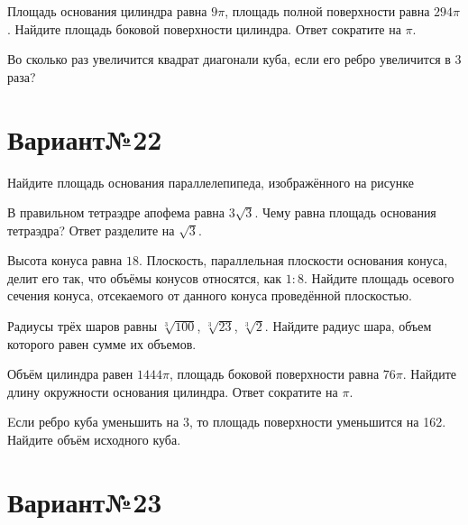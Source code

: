 \documentclass[4apaper]{article}
\begin{document}
\begin{taskBN}{5}
Площадь основания цилиндра равна $9\pi$, площадь полной поверхности равна $294\pi$. Найдите площадь боковой поверхности цилиндра. Ответ сократите на $\pi$.
\end{taskBN}

\begin{taskBN}{6}
Во сколько раз увеличится квадрат диагонали куба, если его ребро увеличится в 3 раза?
\end{taskBN}
\newpage\section*{Вариант№22}

\begin{taskBN}{1}
Найдите площадь основания параллелепипеда, изображённого на рисунке
\end{taskBN}

\begin{taskBN}{2}
В правильном тетраэдре апофема равна $3\sqrt{3}$. Чему равна площадь основания тетраэдра? Ответ разделите на $\sqrt{3}$.
\end{taskBN}

\begin{taskBN}{3}
Высота конуса равна $18$. Плоскость, параллельная плоскости основания конуса,  делит его так, что объёмы конусов относятся, как $1:8$. Найдите площадь осевого сечения конуса, отсекаемого от данного конуса проведённой плоскостью. 
\end{taskBN}

\begin{taskBN}{4}
Радиусы трёх шаров равны $\sqrt[3]{100}$, $\sqrt[3]{23}$, $\sqrt[3]{2}$. Найдите радиус шара, объем которого равен сумме их объемов.
\end{taskBN}

\begin{taskBN}{5}
Объём цилиндра равен $1444\pi$, площадь боковой поверхности равна $76\pi$. Найдите длину окружности основания цилиндра. Ответ сократите на $\pi$.
\end{taskBN}

\begin{taskBN}{6}
Eсли ребро куба уменьшить на 3, то площадь поверхности уменьшится на 162. Найдите объём исходного куба.
\end{taskBN}
\newpage\section*{Вариант№23}
\end{document}

